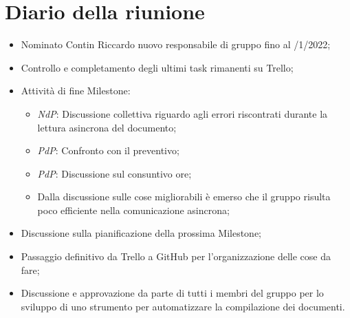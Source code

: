 \section{Diario della riunione}
\begin{itemize}
  \item Nominato Contin Riccardo nuovo responsabile di gruppo fino al 
  /1/2022;
  \item Controllo e completamento degli ultimi task rimanenti su Trello;
  \item Attività di fine Milestone:
  \begin{itemize}
    \item \textit{NdP}: Discussione collettiva riguardo agli errori riscontrati durante la lettura asincrona del documento;
    \item \textit{PdP}: Confronto con il preventivo;
    \item \textit{PdP}: Discussione sul consuntivo ore;
    \item Dalla discussione sulle cose migliorabili è emerso che il gruppo risulta poco efficiente nella comunicazione asincrona;
  \end{itemize}
  \item Discussione sulla pianificazione della prossima Milestone;
  \item Passaggio definitivo da Trello a GitHub per l'organizzazione delle cose da fare;
  \item Discussione e approvazione da parte di tutti i membri del gruppo per lo sviluppo di uno strumento per automatizzare la compilazione dei documenti.
\end{itemize}
